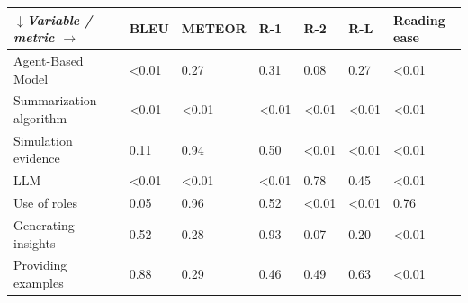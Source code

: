 \begin{tabular}{|l|l|l|l|l|l|l|}
\hline
\textit{$\downarrow$Variable / metric $\rightarrow$} & BLEU & METEOR & R-1 & R-2 & R-L & Reading ease \\
 \hline
 Agent-Based Model & \textless{}0.01 & 0.27 & 0.31 & 0.08 & 0.27 & \textless{}0.01 \\
 \hline
 Summarization algorithm & \textless{}0.01 & \textless{}0.01 & \textless{}0.01 & \textless{}0.01 & \textless{}0.01 & \textless{}0.01 \\
 \hline
 Simulation evidence & 0.11 & 0.94 & 0.50 & \textless{}0.01 & \textless{}0.01 & \textless{}0.01 \\
 \hline
 LLM & \textless{}0.01 & \textless{}0.01 & \textless{}0.01 & 0.78 & 0.45 & \textless{}0.01 \\
 \hline
 Use of roles & 0.05 & 0.96 & 0.52 & \textless{}0.01 & \textless{}0.01 & 0.76 \\
 \hline
 Generating insights & 0.52 & 0.28 & 0.93 & 0.07 & 0.20 & \textless{}0.01 \\
 \hline
 Providing examples & 0.88 & 0.29 & 0.46 & 0.49 & 0.63 & \textless{}0.01 \\
\hline
\end{tabular}

